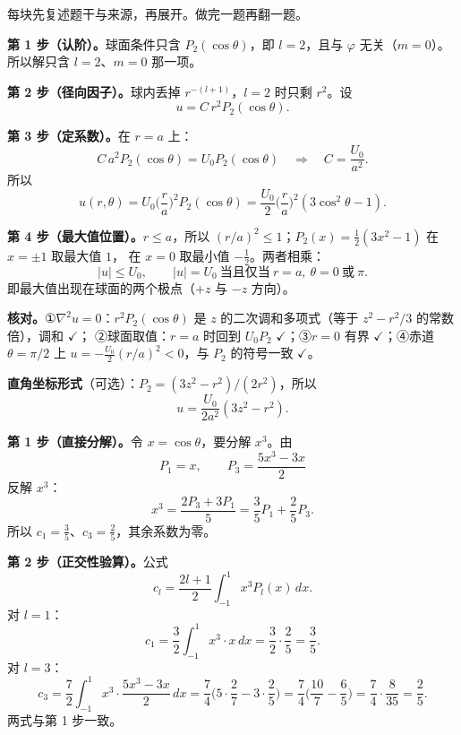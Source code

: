 ﻿%
\label{sec:app}

每块先复述题干与来源，再展开。做完一题再翻一题。


\textbf{第 1 步（认阶）。}球面条件只含 $P_2(\cos\theta)$，即 $l=2$，且与 $\varphi$ 无关（$m=0$）。
所以解只含 $l=2$、$m=0$ 那一项。

\textbf{第 2 步（径向因子）。}球内丢掉 $r^{-(l+1)}$，$l=2$ 时只剩 $r^2$。设
\[
u=C\,r^2P_2(\cos\theta).
\]

\textbf{第 3 步（定系数）。}在 $r=a$ 上：
\[
C\,a^2P_2(\cos\theta)=U_0P_2(\cos\theta)
\quad\Longrightarrow\quad
C=\frac{U_0}{a^2}.
\]
所以
\[
u(r,\theta)=U_0\Big(\frac{r}{a}\Big)^2P_2(\cos\theta)
=\frac{U_0}{2}\Big(\frac{r}{a}\Big)^2(3\cos^2\theta-1).
\]

\textbf{第 4 步（最大值位置）。}$r\le a$，所以 $(r/a)^2\le1$；$P_2(x)=\frac12(3x^2-1)$ 在 $x=\pm1$ 取最大值 $1$，
在 $x=0$ 取最小值 $-\frac12$。两者相乘：
\[
|u|\le U_0,\qquad
|u|=U_0\ \text{当且仅当}\ r=a,\ \theta=0\ \text{或}\ \pi .
\]
即最大值出现在球面的两个极点（$+z$ 与 $-z$ 方向）。

\textbf{核对。}①$\nabla^2u=0$：$r^2P_2(\cos\theta)$ 是 $z$ 的二次调和多项式（等于 $z^2-r^2/3$ 的常数倍），调和 $\checkmark$；
②球面取值：$r=a$ 时回到 $U_0P_2$ $\checkmark$；③$r=0$ 有界 $\checkmark$；④赤道 $\theta=\pi/2$ 上 $u=-\frac{U_0}{2}(r/a)^2<0$，与 $P_2$ 的符号一致 $\checkmark$。

\textbf{直角坐标形式}（可选）：$P_2=(3z^2-r^2)/(2r^2)$，所以
\[
u=\frac{U_0}{2a^2}(3z^2-r^2).
\]


\textbf{第 1 步（直接分解）。}令 $x=\cos\theta$，要分解 $x^3$。由
\[
P_1=x,\qquad P_3=\frac{5x^3-3x}{2}
\]
反解 $x^3$：
\[
x^3=\frac{2P_3+3P_1}{5}=\frac{3}{5}P_1+\frac{2}{5}P_3 .
\]
所以 $c_1=\frac35$、$c_3=\frac25$，其余系数为零。

\textbf{第 2 步（正交性验算）。}公式
\[
c_l=\frac{2l+1}{2}\int_{-1}^{1}x^3P_l(x)\,dx .
\]
对 $l=1$：
\[
c_1=\frac{3}{2}\int_{-1}^1x^3\cdot x\,dx=\frac32\cdot\frac{2}{5}=\frac35 .
\]
对 $l=3$：
\[
c_3=\frac{7}{2}\int_{-1}^1x^3\cdot\frac{5x^3-3x}{2}\,dx
=\frac74\Big(5\cdot\frac{2}{7}-3\cdot\frac{2}{5}\Big)
=\frac74\Big(\frac{10}{7}-\frac65\Big)
=\frac74\cdot\frac{8}{35}=\frac25 .
\]
两式与第 1 步一致。

